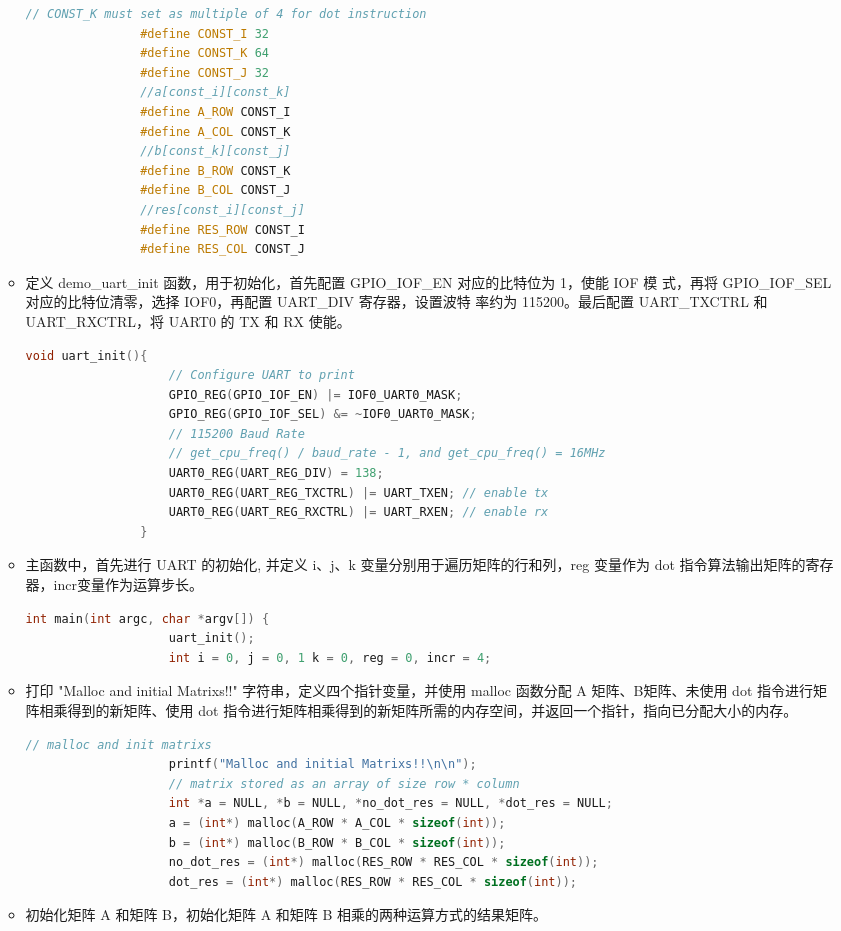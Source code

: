 \documentclass[a4paper, 14pt, oneside]{book} %
\numberwithin{equation}{subsection}
\begin{document}
\begin{enumerate}
\begin{itemize}
\begin{lstlisting}[language={C++}]
				// CONST_K must set as multiple of 4 for dot instruction
				#define CONST_I 32
				#define CONST_K 64
				#define CONST_J 32
				//a[const_i][const_k]
				#define A_ROW CONST_I
				#define A_COL CONST_K
				//b[const_k][const_j]
				#define B_ROW CONST_K
				#define B_COL CONST_J
				//res[const_i][const_j]
				#define RES_ROW CONST_I
				#define RES_COL CONST_J  
			\end{lstlisting}
			\item 定义 demo\_uart\_init 函数，用于初始化，首先配置 GPIO\_IOF\_EN 对应的比特位为 1，使能 IOF 模
			式，再将 GPIO\_IOF\_SEL 对应的比特位清零，选择 IOF0，再配置 UART\_DIV 寄存器，设置波特
			率约为 115200。最后配置 UART\_TXCTRL 和UART\_RXCTRL，将 UART0 的 TX 和 RX 使能。
			\begin{lstlisting}[language={C++}]
				void uart_init(){
					// Configure UART to print
					GPIO_REG(GPIO_IOF_EN) |= IOF0_UART0_MASK;
					GPIO_REG(GPIO_IOF_SEL) &= ~IOF0_UART0_MASK;
					// 115200 Baud Rate
					// get_cpu_freq() / baud_rate - 1, and get_cpu_freq() = 16MHz
					UART0_REG(UART_REG_DIV) = 138;
					UART0_REG(UART_REG_TXCTRL) |= UART_TXEN; // enable tx
					UART0_REG(UART_REG_RXCTRL) |= UART_RXEN; // enable rx
				}
			\end{lstlisting}
			\item 主函数中，首先进行 UART 的初始化, 并定义 i、j、k 变量分别用于遍历矩阵的行和列，reg 变量作为 dot 指令算法输出矩阵的寄存器，incr变量作为运算步长。
			\begin{lstlisting}[language={C++}]
				int main(int argc, char *argv[]) {
					uart_init();
					int i = 0, j = 0, 1 k = 0, reg = 0, incr = 4;			
				\end{lstlisting}
				\item 打印 "Malloc and initial Matrixs!!" 字符串，定义四个指针变量，并使用 malloc 函数分配 A 矩阵、B矩阵、未使用 dot 指令进行矩阵相乘得到的新矩阵、使用 dot 指令进行矩阵相乘得到的新矩阵所需的内存空间，并返回一个指针，指向已分配大小的内存。
				\begin{lstlisting}[language={C++}]
					// malloc and init matrixs
					printf("Malloc and initial Matrixs!!\n\n");
					// matrix stored as an array of size row * column
					int *a = NULL, *b = NULL, *no_dot_res = NULL, *dot_res = NULL;
					a = (int*) malloc(A_ROW * A_COL * sizeof(int));
					b = (int*) malloc(B_ROW * B_COL * sizeof(int));
					no_dot_res = (int*) malloc(RES_ROW * RES_COL * sizeof(int));
					dot_res = (int*) malloc(RES_ROW * RES_COL * sizeof(int));			
				\end{lstlisting}
				\item 初始化矩阵 A 和矩阵 B，初始化矩阵 A 和矩阵 B 相乘的两种运算方式的结果矩阵。

\end{itemize}
\end{enumerate}
\end{document}
